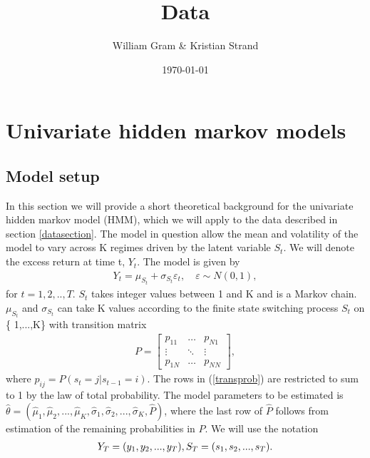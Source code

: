\documentclass[11pt,a4paper,oneside]{article}
\title{Data}
\author{William Gram \& Kristian Strand}
\date{\today}
\begin{document}
\maketitle

\newpage

\rfoot{\thepage}

\tableofcontents

\newpage

\setcounter{page}{1}

\section{Univariate hidden markov models }
\subsection{Model setup}
\noindent In this section we will provide a short theoretical background for the univariate hidden markov model (HMM), which we will apply to the data described in section \ref{datasection}. The model in question allow the mean and volatility of the model to vary across K regimes driven by the latent variable $S_t$. We will denote the excess return at time t, $Y_t$. The model is given by    
\begin{align}
    Y_t=\mu_{S_t}+\sigma_{S_t}\varepsilon_t, \quad \varepsilon \sim N(0,1) \label{univarmodel}, 
\end{align}
for $t=1,2,..,T$. $S_t$ takes integer values between 1 and K and is a Markov chain. $\mu_{S_t}$ and $\sigma_{S_t}$ can take K values according to the finite state switching process $S_t$ on \{ 1,...,K\} with transition matrix  
 \begin{align}\label{transprob}
 P=\begin{bmatrix}
    p_{11} &  \dots  & p_{N1} \\
    \vdots &  \ddots & \vdots \\
    p_{1N} &  \dots  & p_{NN} 
\end{bmatrix},
\end{align}
where $p_{ij}=P(s_t=j \vert s_{t-1}=i)$. The rows in (\ref{transprob}) are restricted to sum to 1 by the law of total probability. The model parameters to be estimated is $\hat{\theta}=(\hat{\mu}_1,\hat{\mu}_2,...,\hat{\mu}_K,\hat{\sigma}_1,\hat{\sigma}_2,...,\hat{\sigma}_K,\hat{P})$, where the last row of $\hat{P}$ follows from estimation of the remaining probabilities in $P$. We will use the notation 
\begin{align}
    Y_T=(y_1,y_2,...,y_T), S_T=(s_1,s_2,...,s_T). \notag
\end{align}
\end{document}
